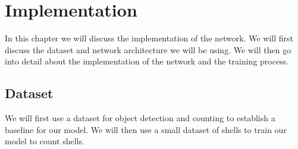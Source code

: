  
\chapter{Implementation}
In this chapter we will discuss the implementation of the network. We will first discuss the dataset and network architecture we will be using. We will then go into detail about the implementation of the network and the training process. 

\section{Dataset}
We will first use a dataset for object detection and counting to establish a baseline for our model. We will then use a small dataset of shells to train our model to count shells.